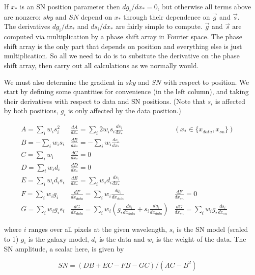 \documentclass[12pt]{article}
\begin{document}
\noindent If $x_\ast$ is an SN position parameter then $dg_i/dx_\ast = 0$,
but otherwise all terms above are nonzero: $sky$ and $SN$
depend on $x_\ast$ through their dependence on $\vec{g}$ and
$\vec{s}$. The derivatives $dg_i/dx_\ast$ and $ds_i/dx_\ast$ are fairly
simple to compute. $\vec{g}$ and $\vec{s}$ are computed via
multiplication by a phase shift array in Fourier space. The phase
shift array is the only part that depends on position and everything
else is just multiplication. So all we need to do is to subsitute the
derivative on the phase shift array, then carry out all calculations
as we normally would.

We must also determine the gradient in $sky$ and $SN$ with respect to
position.  We start by defining some quantities for
convenience (in the left column), and taking their derivatives with respect to
data and SN positions. (Note that $s_i$ is affected by both positions, $g_i$ is only affected by the data position.)

\begin{displaymath}
\begin{array}{ccc}
A = \sum_i w_i s_i^2    & \frac{dA}{dx_\ast} = \sum_i 2 w_i s_i \frac{ds_i}{dx_\ast}   &   (x_\ast \in \{x_{data}, x_{sn}\}) \\
B = -\sum_i w_i s_i    & \frac{dB}{dx_\ast} = -\sum_i w_i \frac{ds_i}{dx_\ast} \\
C = \sum_i w_i         & \frac{dC}{dx_\ast} = 0 \\
D = \sum_i w_i d_i     & \frac{dD}{dx_\ast} = 0 \\%
E = \sum_i w_i d_i s_i  & \frac {dE}{dx_\ast} = \sum_i w_i d_i  \frac{ds_i}{dx_\ast} \\ %
F = \sum_i w_i g_i     & \frac{dF}{dx_{data}} = \sum_i w_i \frac{dg_i}{dx_{data}}   &    \frac{dF}{dx_{sn}} = 0 \\ %
G = \sum_i w_i g_i s_i  & \frac{dG}{dx_{data}} = \sum_i w_i \left(g_i \frac{ds_i}{dx_{data}} + s_i \frac{dg_i}{dx_{data}} \right) & \frac{dG}{dx_{sn}} = \sum_i w_i g_i \frac{ds_i}{dx_{sn}} %
\end{array}
\end{displaymath}

\noindent where $i$ ranges over all pixels at the given wavelength,
$s_i$ is the SN model (scaled to 1) $g_i$ is the galaxy model, $d_i$
is the data and $w_i$ is the weight of the data. The SN amplitude, a
scalar here, is given by

\begin{equation}
SN = (DB + EC - FB - GC) / (AC - B^2)
\end{equation}
\end{document}
